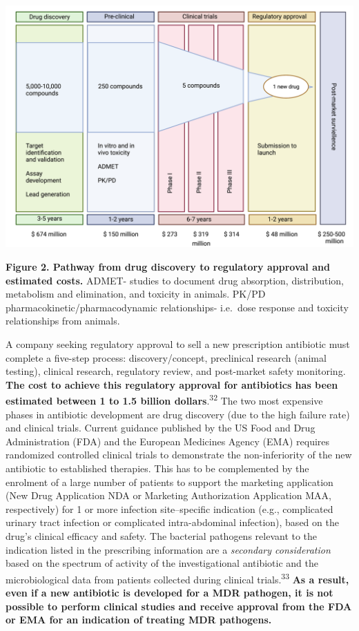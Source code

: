 \documentclass[
  11pt,
  paper=a4,
  ,captions=tableheading
]{scrartcl}
\begin{document}
\includegraphics[width=6.25in,height=\textheight]{images/clinical trial.png}

\textbf{Figure 2. Pathway from drug discovery to regulatory approval and
estimated costs.} ADMET- studies to document drug absorption,
distribution, metabolism and elimination, and toxicity in animals. PK/PD
pharmacokinetic/pharmacodynamic relationships- i.e.~dose response and
toxicity relationships from animals.

A company seeking regulatory approval to sell a new prescription
antibiotic must complete a five-step process: discovery/concept,
preclinical research (animal testing), clinical research, regulatory
review, and post-market safety monitoring. \textbf{The cost to achieve
this regulatory approval for antibiotics has been estimated between 1 to
1.5 billion dollars}.\textsuperscript{32} The two most expensive phases
in antibiotic development are drug discovery (due to the high failure
rate) and clinical trials. Current guidance published by the US Food and
Drug Administration (FDA) and the European Medicines Agency (EMA)
requires randomized controlled clinical trials to demonstrate the
non-inferiority of the new antibiotic to established therapies. This has
to be complemented by the enrolment of a large number of patients to
support the marketing application (New Drug Application NDA or Marketing
Authorization Application MAA, respectively) for 1 or more infection
site--specific indication (e.g., complicated urinary tract infection or
complicated intra-abdominal infection), based on the drug's clinical
efficacy and safety. The bacterial pathogens relevant to the indication
listed in the prescribing information are a \emph{secondary
consideration} based on the spectrum of activity of the investigational
antibiotic and the microbiological data from patients collected during
clinical trials.\textsuperscript{33} \textbf{As a result, even if a new
antibiotic is developed for a MDR pathogen, it is not possible to
perform clinical studies and receive approval from the FDA or EMA for an
indication of treating MDR pathogens.}
\end{document}
